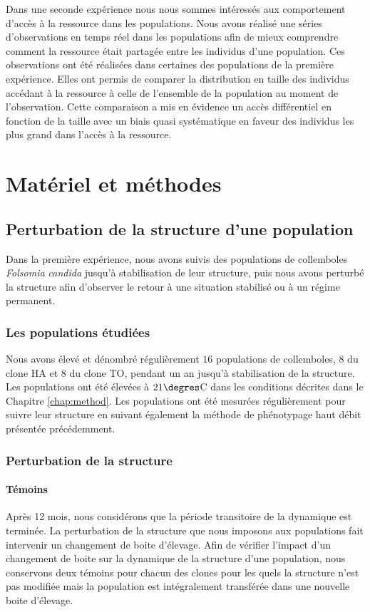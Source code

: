 Dans une seconde expérience nous nous sommes intéressés aux comportement d'accès
à la ressource dans les populations. Nous avons réalisé une séries
d'observations en temps réel dans les populations afin de mieux comprendre
comment la ressource était partagée entre les individus d'une population. Ces
observations ont été réalisées dans certaines des populations de la première
expérience. Elles ont permis de comparer la distribution en taille des individus
accédant à la ressource à celle de l'ensemble de la population au moment de
l'observation. Cette comparaison a mis en évidence un accès différentiel en
fonction de la taille avec un biais quasi systématique en faveur des individus
les plus grand dans l'accès à la ressource. 

\section{Matériel et méthodes}

\subsection{Perturbation de la structure d'une population}

Dans la première expérience, nous avons suivis des populations de collemboles
\textit{Folsomia candida} jusqu'à stabilisation de leur structure, puis nous
avons perturbé la structure afin d'observer le retour à une situation stabilisé
ou à un régime permanent. 

\subsubsection{Les populations étudiées}

Nous avons élevé et dénombré régulièrement $16$ populations de collemboles, $8$
du clone HA et $8$ du clone TO, pendant un an jusqu'à stabilisation de la
structure. Les populations ont été élevées à $21\degres$C dans les conditions
décrites dans le Chapitre \ref{chap:method}. Les populations ont été mesurées
régulièrement pour suivre leur structure en suivant également la méthode de
phénotypage haut débit présentée précédemment.

\subsubsection{Perturbation de la structure}

\paragraph{Témoins} Après 12 mois, nous considérons que la période transitoire
de la dynamique est terminée. La perturbation de la structure que nous imposons
aux populations fait intervenir un changement de boite d'élevage. Afin de
vérifier l'impact d'un changement de boite sur la dynamique de la structure
d'une population, nous conservons deux témoins pour chacun des clones pour les
quels la structure n'est pas modifiée mais la population est intégralement
transférée dans une nouvelle boite d'élevage.

